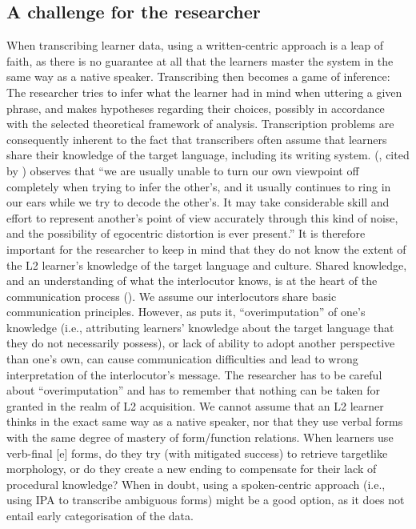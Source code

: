 \documentclass[output=paper,colorlinks,citecolor=brown,modfonts,nonflat]{../langscibook}
\begin{document}
\subsection{ \textbf{A challenge for the researcher}}%

When transcribing learner data, using a written-centric approach is a leap of faith, as there is no guarantee at all that the learners master the system in the same way as a native speaker. Transcribing then becomes a game of inference: The researcher tries to infer what the learner had in mind when uttering a given phrase, and makes hypotheses regarding their choices, possibly in accordance with the selected theoretical framework of analysis. Transcription problems are consequently inherent to the fact that transcribers often assume that learners share their knowledge of the target language, including its writing system. \citeauthor{Flavell1977} (\citeyear{Flavell1977}, cited by \citealt[739]{Nickerson1999}) observes that “we are usually unable to turn our own viewpoint off completely when trying to infer the other’s, and it usually continues to ring in our ears while we try to decode the other’s. It may take considerable skill and effort to represent another’s point of view accurately through this kind of noise, and the possibility of egocentric distortion is ever present.” It is therefore important for the researcher to keep in mind that they do not know the extent of the L2 learner’s knowledge of the target language and culture. Shared knowledge, and an understanding of what the interlocutor knows, is at the heart of the communication process (\citealt{Nickerson1999,KeysarEtAl2003}). We assume our interlocutors share basic communication principles. However, as \citet{Nickerson1999} puts it, “overimputation” of one’s knowledge (i.e., attributing learners’ knowledge about the target language that they do not necessarily possess), or lack of ability to adopt another perspective than one’s own, can cause communication difficulties and lead to wrong interpretation of the interlocutor’s message. The researcher has to be careful about “overimputation” and has to remember that nothing can be taken for granted in the realm of L2 acquisition. We cannot assume that an L2 learner thinks in the exact same way as a native speaker, nor that they use verbal forms with the same degree of mastery of form/function relations. When learners use verb-final [e] forms, do they try (with mitigated success) to retrieve targetlike morphology, or do they create a new ending to compensate for their lack of procedural knowledge? When in doubt, using a spoken-centric approach (i.e., using IPA to transcribe ambiguous forms) might be a good option, as it does not entail early categorisation of the data.
\end{document}
